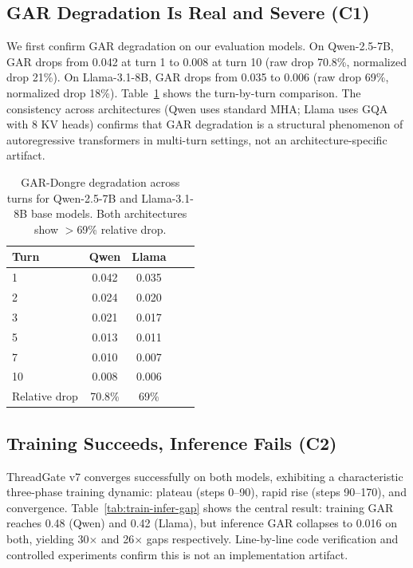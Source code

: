 \documentclass[11pt]{article}
\begin{document}
\subsection{GAR Degradation Is Real and Severe (C1)}

We first confirm GAR degradation on our evaluation models. On Qwen-2.5-7B, GAR drops from 0.042 at turn 1 to 0.008 at turn 10 (raw drop 70.8\%, normalized drop 21\%). On Llama-3.1-8B, GAR drops from 0.035 to 0.006 (raw drop 69\%, normalized drop 18\%). Table~\ref{tab:gar-degradation} shows the turn-by-turn comparison. The consistency across architectures (Qwen uses standard MHA; Llama uses GQA with 8 KV heads) confirms that GAR degradation is a structural phenomenon of autoregressive transformers in multi-turn settings, not an architecture-specific artifact.

\begin{table}[t]
\centering
\small
\begin{tabular}{lcccc}
\toprule
\textbf{Turn} & \textbf{Qwen} & \textbf{Llama} \\
\midrule
1 & 0.042 & 0.035 \\
2 & 0.024 & 0.020 \\
3 & 0.021 & 0.017 \\
5 & 0.013 & 0.011 \\
7 & 0.010 & 0.007 \\
10 & 0.008 & 0.006 \\
\midrule
Relative drop & 70.8\% & 69\% \\
\bottomrule
\end{tabular}
\caption{GAR-Dongre degradation across turns for Qwen-2.5-7B and Llama-3.1-8B base models. Both architectures show $>$69\% relative drop.}
\label{tab:gar-degradation}
\end{table}

\subsection{Training Succeeds, Inference Fails (C2)}

ThreadGate v7 converges successfully on both models, exhibiting a characteristic three-phase training dynamic: plateau (steps 0--90), rapid rise (steps 90--170), and convergence. Table~\ref{tab:train-infer-gap} shows the central result: training GAR reaches 0.48 (Qwen) and 0.42 (Llama), but inference GAR collapses to 0.016 on both, yielding 30$\times$ and 26$\times$ gaps respectively. Line-by-line code verification and controlled experiments confirm this is not an implementation artifact.
\end{document}
